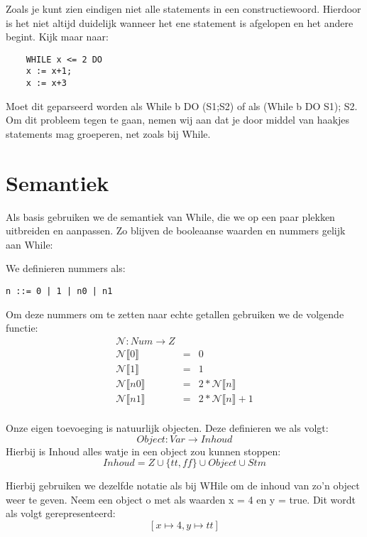 \documentclass[12pt]{article}
\begin{document}
Zoals je kunt zien eindigen niet alle statements in een constructiewoord. Hierdoor is het niet altijd duidelijk wanneer het ene statement is afgelopen en het andere begint. Kijk maar naar:
\begin{lstlisting}
	WHILE x <= 2 DO
	x := x+1;
	x := x+3
\end{lstlisting}
Moet dit geparseerd worden als While b DO (S1;S2) of als (While b DO S1); S2. Om dit probleem tegen te gaan, nemen wij aan dat je door middel van haakjes statements mag groeperen, net zoals bij While.
\pagebreak
\section{Semantiek}

Als basis gebruiken we de semantiek van While, die we op een paar plekken uitbreiden en aanpassen.
Zo blijven de booleaanse waarden en nummers gelijk aan While:

We definieren nummers als:
\begin{lstlisting}
n ::= 0 | 1 | n0 | n1
\end{lstlisting}

Om deze nummers om te zetten naar echte getallen gebruiken we de volgende functie:
$$
\begin{matrix}
\mathcal{N}: Num \rightarrow Z \\
\mathcal{N}\llbracket 0 \rrbracket &= &0  \\
\mathcal{N}\llbracket 1 \rrbracket &= &1 \\
\mathcal{N}\llbracket n0 \rrbracket &= &2 * \mathcal{N}\llbracket n \rrbracket \\
\mathcal{N}\llbracket n1 \rrbracket &= &2 * \mathcal{N}\llbracket n \rrbracket + 1 \\
\end{matrix}
$$

Onze eigen toevoeging is natuurlijk objecten. Deze definieren we als volgt:
$$Object : Var \rightarrow Inhoud$$ 
Hierbij is Inhoud alles watje in een object zou kunnen stoppen: 
$$Inhoud = Z \cup \{tt,ff\} \cup Object \cup Stm$$ 

Hierbij gebruiken we dezelfde notatie als bij WHile om de inhoud van zo'n object weer te geven.
Neem een object o met als waarden x = 4 en y = true. Dit wordt als volgt gerepresenteerd:
$$[x \mapsto 4, y \mapsto tt]$$
\end{document}

